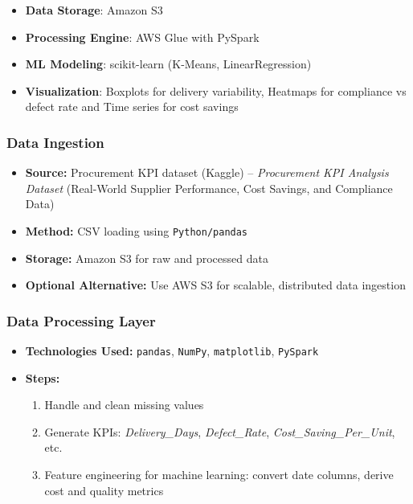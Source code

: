 \documentclass[10pt, twocolumn]{article}
\begin{document}
\begin{itemize}
    \item \textbf{Data Storage}: Amazon S3
    \item \textbf{Processing Engine}: AWS Glue with PySpark
    \item \textbf{ML Modeling}: scikit-learn (K-Means, LinearRegression)
    \item \textbf{Visualization}: Boxplots for delivery variability, Heatmaps for compliance vs defect rate and Time series for cost savings
\end{itemize}


\subsubsection{Data Ingestion}

\begin{itemize}
    \item \textbf{Source:} Procurement KPI dataset (Kaggle) -- \textit{Procurement KPI Analysis Dataset} (Real-World Supplier Performance, Cost Savings, and Compliance Data)
    \item \textbf{Method:} CSV loading using \texttt{Python/pandas}
    \item \textbf{Storage:} Amazon S3 for raw and processed data
    \item \textbf{Optional Alternative:} Use AWS S3 for scalable, distributed data ingestion
\end{itemize}

\vspace{1em}

\subsubsection{Data Processing Layer}

\begin{itemize}
    \item \textbf{Technologies Used:} \texttt{pandas}, \texttt{NumPy}, \texttt{matplotlib}, \texttt{PySpark}
    \item \textbf{Steps:}
    \begin{enumerate}
        \item Handle and clean missing values
        \item Generate KPIs: \textit{Delivery\_Days}, \textit{Defect\_Rate}, \textit{Cost\_Saving\_Per\_Unit}, etc.
        \item Feature engineering for machine learning: convert date columns, derive cost and quality metrics
    \end{enumerate}
\end{itemize}
\end{document}
